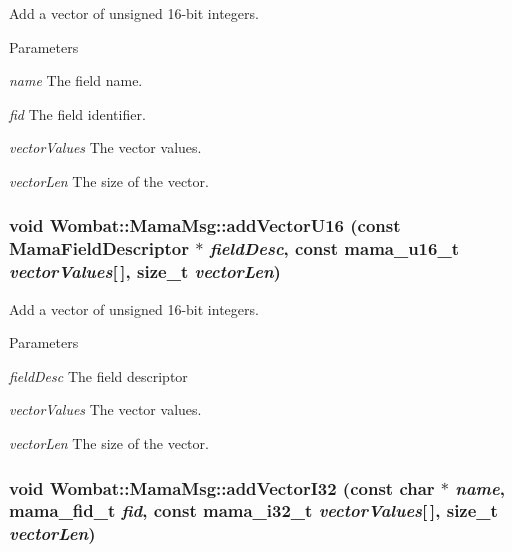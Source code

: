 Add a vector of unsigned 16-\/bit integers. 
\begin{DoxyParams}{Parameters}
\item[{\em name}]The field name. \item[{\em fid}]The field identifier. \item[{\em vectorValues}]The vector values. \item[{\em vectorLen}]The size of the vector. \end{DoxyParams}
\hypertarget{classWombat_1_1MamaMsg_aaf6463e54b99ffa9bc5a7e2e99effa75}{
\subsubsection[{addVectorU16}]{\setlength{\rightskip}{0pt plus 5cm}void Wombat::MamaMsg::addVectorU16 (const {\bf MamaFieldDescriptor} $\ast$ {\em fieldDesc}, \/  const mama\_\-u16\_\-t {\em vectorValues}\mbox{[}$\,$\mbox{]}, \/  size\_\-t {\em vectorLen})}}
\label{classWombat_1_1MamaMsg_aaf6463e54b99ffa9bc5a7e2e99effa75}


Add a vector of unsigned 16-\/bit integers. 
\begin{DoxyParams}{Parameters}
\item[{\em fieldDesc}]The field descriptor \item[{\em vectorValues}]The vector values. \item[{\em vectorLen}]The size of the vector. \end{DoxyParams}
\hypertarget{classWombat_1_1MamaMsg_a7db36a811a4d614aae1f547304afcd94}{
\subsubsection[{addVectorI32}]{\setlength{\rightskip}{0pt plus 5cm}void Wombat::MamaMsg::addVectorI32 (const char $\ast$ {\em name}, \/  mama\_\-fid\_\-t {\em fid}, \/  const mama\_\-i32\_\-t {\em vectorValues}\mbox{[}$\,$\mbox{]}, \/  size\_\-t {\em vectorLen})}}
\label{classWombat_1_1MamaMsg_a7db36a811a4d614aae1f547304afcd94}



